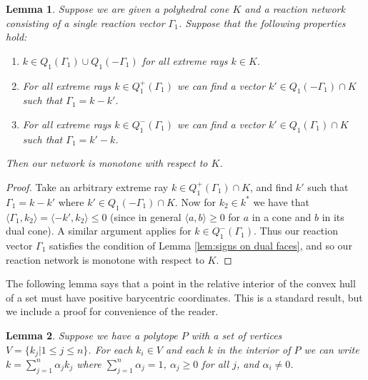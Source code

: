 \documentclass{article}
\newtheorem{lem}{Lemma}
\begin{document}
\begin{lem}
\label{lem:subtract_off}
    Suppose we are given a polyhedral cone $K$ and a reaction network consisting of a single reaction vector $\Gamma_1$. Suppose that the following properties hold: 
    \begin{enumerate}
        \item $k \in  Q_1(\Gamma_1) \cup Q_1(-\Gamma_1)$ for all extreme rays $k \in K$.
        \item For all extreme rays $k \in Q_1^+(\Gamma_1)$ we can find a vector $k' \in Q_1(-\Gamma_1) \cap K$ such that $\Gamma_1 = k - k'$.
        \item For all extreme rays $k \in Q_1^-(\Gamma_1)$ we can find a vector $k' \in Q_1(\Gamma_1) \cap K$ such that $\Gamma_1 = k' - k$.
    \end{enumerate} 
    
    Then our network is monotone with respect to $K$.
\end{lem}





\begin{proof}
    Take an arbitrary extreme ray $k \in Q_1^+(\Gamma_1) \cap K$, and find $k'$ such that $\Gamma_1 = k - k' $ where $k' \in Q_1(-\Gamma_1) \cap K$. Now for $k_2 \in k^*$ we have that $ \langle \Gamma_1, k_2 \rangle = \langle -k', k_2 \rangle \leq 0$ (since in general $\langle a,b \rangle \geq 0$ for $a$ in a cone and $b$ in its dual cone). A similar argument applies for $k \in Q_1^-(\Gamma_1)$. Thus our reaction vector $\Gamma_1$ satisfies the condition of Lemma \ref{lem:signs on dual faces}, and so our reaction network is monotone with respect to $K$. 
    
    
\end{proof}



The following lemma says that a point in the relative interior of the convex hull of a set must have positive barycentric coordinates. This is a standard result, but we include a proof for convenience of the reader.


\begin{lem}
\label{lem:convex_sums_for_interior}
    Suppose we have a polytope $P$ with a set of vertices $V = \{k_j| 1 \leq j \leq n\}$. For each $k_i \in V$ and each $k$ in the interior of $P$ we can write $k = \sum_{j=1}^n \alpha_j k_j$ where $\sum_{j=1}^n \alpha_j = 1$, $\alpha_j \geq 0$ for all $j$, and $\alpha_i \neq 0$. 
\end{lem}
\end{document}
